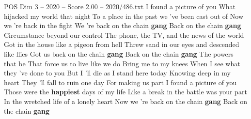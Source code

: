 \begin{textsample}{POS Dim 3 – 2020 – Score 2.00 – 2020/486.txt}  \label{ex:f3_pos_004}
I found a picture of you What hijacked my world that night To a place in the past we 've been cast out of Now we 're back in the fight We 're back on the chain \textbf{gang} Back on the chain \textbf{gang} Circumstance beyond our control The phone, the TV, and the news of the world Got in the house like a pigeon from hell Threw sand in our eyes and descended like flies Got us back on the chain \textbf{gang} Back on the chain \textbf{gang} The powers that be That force us to live like we do Bring me to my knees When I see what they 've done to you But I 'll die as I stand here today Knowing deep in my heart They 'll fall to ruin one day For making us part I found a picture of you Those were the \textbf{happiest} days of my life Like a break in the battle was your part In the wretched life of a lonely heart Now we 're back on the chain \textbf{gang} Back on the chain \textbf{gang}

\end{textsample}
